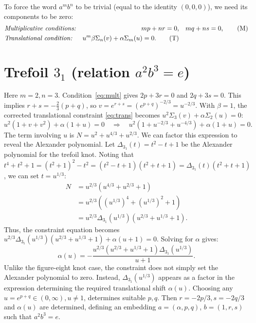 \documentclass{article}
\begin{document}
To force the word $a^{m}b^{n}$ to be trivial (equal to the identity $(0,0,0)$), we need its components to be zero:
\begin{align}
&\text{\textit{Multiplicative conditions:}} & mp+nr=0, & \quad mq+ns=0, \label{eq:mult} \tag{M} \\
&\text{\textit{Translational condition:}} & u^m \beta\Sigma_{n}(v) + \alpha\Sigma_{m}(u)=0. \label{eq:trans} \tag{T}
\end{align}

\section{Trefoil $3_1$ (relation $a^{2}b^{3}=e$)}
Here $m=2, n=3$. Condition~\eqref{eq:mult} gives $2p+3r=0$ and $2q+3s=0$. This implies $r+s = -\frac{2}{3}(p+q)$, so $v = e^{r+s} = (e^{p+q})^{-2/3} = u^{-2/3}$.
With $\beta=1$, the corrected translational constraint \eqref{eq:trans} becomes $u^2 \Sigma_3(v) + \alpha \Sigma_2(u) = 0$:
\begin{equation}
u^2(1+v+v^2) + \alpha(1+u) = 0 \quad \Rightarrow \quad u^2(1+u^{-2/3}+u^{-4/3}) + \alpha(1+u) = 0.
\end{equation}
The term involving $u$ is $N = u^2 + u^{4/3} + u^{2/3}$. We can factor this expression to reveal the Alexander polynomial. Let $\Delta_{3_1}(t) = t^2 - t + 1$ be the Alexander polynomial for the trefoil knot. Noting that $t^4+t^2+1 = (t^2+1)^2 - t^2 = (t^2-t+1)(t^2+t+1) = \Delta_{3_1}(t)(t^2+t+1)$, we can set $t=u^{1/3}$:
\begin{align}
N &= u^{2/3}(u^{4/3} + u^{2/3} + 1) \\
&= u^{2/3}((u^{1/3})^4 + (u^{1/3})^2 + 1) \\
&= u^{2/3} \Delta_{3_1}(u^{1/3}) (u^{2/3} + u^{1/3} + 1).
\end{align}
Thus, the constraint equation becomes $u^{2/3} \Delta_{3_1}(u^{1/3}) (u^{2/3} + u^{1/3} + 1) + \alpha(u+1) = 0$.
Solving for $\alpha$ gives:
\begin{equation}
\alpha(u) = - \frac{u^{2/3} (u^{2/3} + u^{1/3} + 1) \Delta_{3_1}(u^{1/3})}{u+1}.
\end{equation}
Unlike the figure-eight knot case, the constraint does not simply set the Alexander polynomial to zero. Instead, $\Delta_{3_1}(u^{1/3})$ appears as a factor in the expression determining the required translational shift $\alpha(u)$. Choosing any $u=e^{p+q} \in (0,\infty), u\ne1$, determines suitable $p,q$. Then $r=-2p/3, s=-2q/3$ and $\alpha(u)$ are determined, defining an embedding $a=(\alpha,p,q)$, $b=(1,r,s)$ such that $a^2 b^3 = e$.
\end{document}
